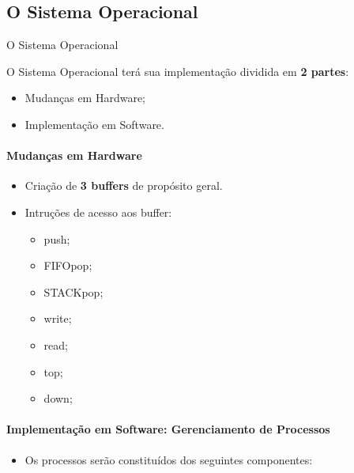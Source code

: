 \documentclass[aspectratio=169]{beamer}
\begin{document}
	\subsection{O Sistema Operacional}
	\begin{frame}{O Sistema Operacional}
		\only<1>
		{
			O Sistema Operacional terá sua implementação dividida em \textbf{2 partes}:
			
			\begin{itemize}
				\item Mudanças em Hardware;
			
			\vspace{0.5cm}
			
				\item Implementação em Software.
			\end{itemize}
		}
		{
			\framesubtitle{Mudanças em Hardware}
			\begin{itemize}
				
				\item Criação de \textbf{3 buffers} de propósito geral.
				
				\vspace{0.5cm}
				
				\item Intruções de acesso aos buffer: 
				\begin{itemize}
					\item push;
					\vspace{0.2cm}
					\item FIFOpop;
					\vspace{0.2cm}
					\item STACKpop;
					\vspace{0.2cm}
					\item write;
					\vspace{0.2cm}
					\item read;
					\vspace{0.2cm}
					\item top;
					\vspace{0.2cm}
					\item down; 
				\end{itemize}
			
			\end{itemize}			
		}
		{
			\framesubtitle{Implementação em Software: Gerenciamento de Processos}
			\begin{itemize}
				
				\item Os processos serão constituídos dos seguintes componentes:
				

\end{itemize}}
\end{frame}
\end{document}
